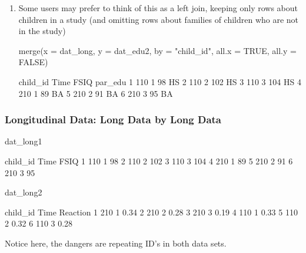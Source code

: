 \documentclass[10pt,american]{beamer}
\renewenvironment{Schunk}{}{}
\renewenvironment{Sinput}{}{}
\begin{document}
\begin{frame}
\begin{enumerate}
\item Some users may prefer to think of this as a left join, keeping
  only rows about children in a study (and omitting rows about families
  of children who are not in the study)
  
\begin{Schunk}
\begin{Sinput}
 merge(x = dat_long, y = dat_edu2, by = "child_id", all.x = TRUE, all.y = FALSE)
\end{Sinput}
\begin{Soutput}
  child_id Time FSIQ par_edu
1      110    1   98      HS
2      110    2  102      HS
3      110    3  104      HS
4      210    1   89      BA
5      210    2   91      BA
6      210    3   95      BA
\end{Soutput}
\end{Schunk}
\end{enumerate}
\end{frame}    
        
\begin{frame}[containsverbatim]
\frametitle{Longitudinal Data: Long Data by Long Data}
\begin{Schunk}
\begin{Sinput}
 dat_long1
\end{Sinput}
\begin{Soutput}
  child_id Time FSIQ
1      110    1   98
2      110    2  102
3      110    3  104
4      210    1   89
5      210    2   91
6      210    3   95
\end{Soutput}
\begin{Sinput}
 dat_long2
\end{Sinput}
\begin{Soutput}
  child_id Time Reaction
1      210    1     0.34
2      210    2     0.28
3      210    3     0.19
4      110    1     0.33
5      110    2     0.32
6      110    3     0.28
\end{Soutput}
\end{Schunk}
Notice here, the dangers are repeating ID's in both data sets.
\end{frame}
\end{document}
